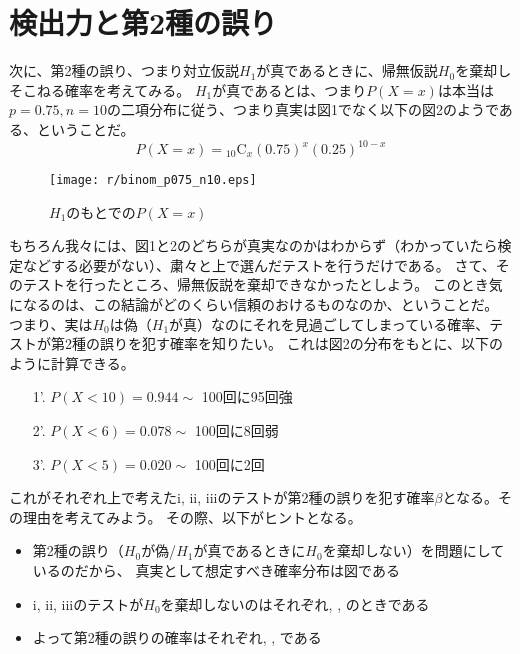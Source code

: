 \documentclass{jsarticle}
\begin{document}
\section{検出力と第2種の誤り}
次に、第2種の誤り、つまり対立仮説$H_1$が真であるときに、帰無仮説$H_0$を棄却しそこねる確率を考えてみる。
$H_1$が真であるとは、つまり$P(X=x)$は本当は$p=0.75, n=10$の二項分布に従う、つまり真実は図1でなく以下の図2のようである、ということだ。
\[
  P(X=x) = {}_{10} \mathrm{C}_{x}  (0.75)^{x} (0.25)^{10-x}
\]
\begin{figure}[h]
 \centering
 \texttt{[image: r/binom\_p075\_n10.eps]}
 \caption{$H_1$のもとでの$P(X=x)$}
\end{figure}

もちろん我々には、図1と2のどちらが真実なのかはわからず（わかっていたら検定などする必要がない）、粛々と上で選んだテストを行うだけである。
さて、そのテストを行ったところ、帰無仮説を棄却できなかったとしよう。
このとき気になるのは、この結論がどのくらい信頼のおけるものなのか、ということだ。
つまり、実は$H_0$は偽（$H_1$が真）なのにそれを見過ごしてしまっている確率、テストが第2種の誤りを犯す確率を知りたい。
これは図2の分布をもとに、以下のように計算できる。
\begin{enumerate}
 \item[1'.] $P(X<10) = 0.944 \sim$ 100回に95回強 
 \item[2'.] $P(X < 6) = 0.078 \sim$ 100回に8回弱 
 \item[3'.] $P(X < 5) = 0.020 \sim$ 100回に2回 
\end{enumerate}

これがそれぞれ上で考えたi, ii, iiiのテストが第2種の誤りを犯す確率$\beta$となる。その理由を考えてみよう。
その際、以下がヒントとなる。
\begin{itemize}
 \item 第2種の誤り（$H_0$が偽/$H_1$が真であるときに$H_0$を棄却しない）を問題にしているのだから、
       真実として想定すべき確率分布は図\underline{\hspace{1cm}}である
 \item i, ii, iiiのテストが$H_0$を棄却しないのはそれぞれ\underline{\hspace{2cm}}, \underline{\hspace{2cm}}, \underline{\hspace{2cm}}のときである
 \item よって第2種の誤りの確率はそれぞれ\underline{\hspace{2cm}}, \underline{\hspace{2cm}}, \underline{\hspace{2cm}}である
\end{itemize}
\end{document}
